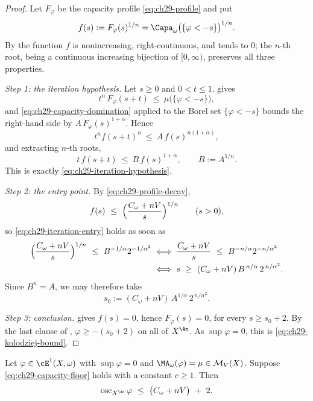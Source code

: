\begin{proof}
Let \(F_\varphi\) be the capacity profile \eqref{eq:ch29-profile} and put
\[
 f(s):=F_\varphi(s)^{1/n}=\Capa_\omega\bigl(\{\varphi<-s\}\bigr)^{1/n}.
\]
By  the function \(f\) is nonincreasing,
right-continuous, and tends to \(0\); the \(n\)-th root, being a continuous
increasing bijection of \([0,\infty)\), preserves all three properties.

\emph{Step 1: the iteration hypothesis.}  Let \(s\geq0\) and
\(0<t\leq1\).   gives
\[
 t^n\,F_\varphi(s+t)\ \leq\ \mu\bigl(\{\varphi<-s\}\bigr),
\]
and \eqref{eq:ch29-capacity-domination} applied to the Borel set
\(\{\varphi<-s\}\) bounds the right-hand side by
\(A\,F_\varphi(s)^{1+\alpha}\).  Hence
\[
 t^n f(s+t)^n\ \leq\ A\,f(s)^{n(1+\alpha)} ,
\]
and extracting \(n\)-th roots,
\begin{equation}
\label{eq:ch29-iteration-verified}
 t\,f(s+t)\ \leq\ B\,f(s)^{1+\alpha},
 \qquad B:=A^{1/n}.
\end{equation}
This is exactly \eqref{eq:ch29-iteration-hypothesis}.

\emph{Step 2: the entry point.}  By \eqref{eq:ch29-profile-decay},
\[
 f(s)\ \leq\ \Bigl(\frac{C_\omega+nV}{s}\Bigr)^{1/n}
 \qquad(s>0),
\]
so \eqref{eq:ch29-iteration-entry} holds as soon as
\[
\begin{aligned}
 \Bigl(\frac{C_\omega+nV}{s}\Bigr)^{1/n}
 \ \leq\ B^{-1/\alpha}2^{-1/\alpha^2}
 &\iff
 \frac{C_\omega+nV}{s}\ \leq\ B^{-n/\alpha}2^{-n/\alpha^2}\\
 &\iff
 s\ \geq\ (C_\omega+nV)\,B^{\,n/\alpha}\,2^{\,n/\alpha^2}.
\end{aligned}
\]
Since \(B^{n}=A\), we may therefore take
\begin{equation}
\label{eq:ch29-entry-point}
 s_0:=(C_\omega+nV)\,A^{1/\alpha}\,2^{\,n/\alpha^2}.
\end{equation}

\emph{Step 3: conclusion.}   gives \(f(s)=0\), hence
\(F_\varphi(s)=0\), for every \(s\geq s_0+2\).  By the last clause of
, \(\varphi\geq-(s_0+2)\) on all of
\(X^{\An}\).  As \(\sup\varphi=0\), this is
\eqref{eq:ch29-kolodziej-bound}.
\end{proof}

\begin{corollary}
\label{cor:ch29-kolodziej-floor}
Let \(\varphi\in\cE^1(X,\omega)\) with \(\sup\varphi=0\) and
\(\MA_\omega(\varphi)=\mu\in\mathcal M_V(X)\).  Suppose
\eqref{eq:ch29-capacity-floor} holds with a constant \(c\geq1\).  Then
\begin{equation}
\label{eq:ch29-kolodziej-floor-bound}
 \operatorname{osc}_{X^{\An}}\varphi
 \ \leq\ \bigl(C_\omega+nV\bigr)\ +\ 2 .
\end{equation}
\end{corollary}

